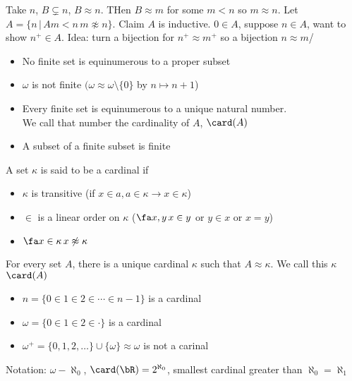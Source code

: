 \begin{pf}
    Take $n$, $B \subsetneq n$, $B \approx n$. THen $B \approx m$ for some $m < n$ so $m \approx n$. Let $A = \{n \, | \, A m < n \, m \not\approx n\}$. Claim $A$ is inductive. $0 \in A$, suppose $n \in A$, want to show $n^+ \in A$. Idea: turn a bijection for $n^+ \approx m^+$ so a bijection $n \approx m$/
\end{pf}

\begin{corollary}
    \begin{itemize}
        \item No finite set is equinumerous to a proper subset 
        \item $\omega$ is not finite $(\omega \approx \omega \setminus \{0\}$ by $n \mapsto n+1$)
        \item Every finite set is equinumerous to a unique natural number. \\
        We call that number the cardinality of $A$, $\card(A)$
        \item A subset of a finite subset is finite
    \end{itemize}
\end{corollary}

\begin{definition}
    A set $\kappa$ is said to be a cardinal if 
    \begin{itemize}
        \item $\kappa$ is transitive (if $x \in a, a \in \kappa \to x \in \kappa$)
        \item $\in$ is a linear order on $\kappa$ ($\fa x, y \, x \in y$ or $y \in x$ or $x=y$) 
        \item $\fa x \in \kappa \, x \not\approx \kappa$
    \end{itemize}
\end{definition}

\begin{theorem}
    For every set $A$, there is a unique cardinal $\kappa$ such that $A \approx \kappa$. We call this $\kappa$ $\card(A)$
\end{theorem}

\begin{example}
    \begin{itemize}
        \item $n = \{0 \in 1 \in 2 \in \cdots \in n-1\}$ is a cardinal 
        \item $\omega = \{0 \in 1 \in 2 \in \cdot \}$ is a cardinal 
        \item $\omega^+ = \{0, 1, 2, \ldots\} \cup \{\omega\} \approx \omega$ is not a carinal
    \end{itemize}
\end{example}

\noindent
Notation: $\omega - \aleph_0$, $\card(\bR) = 2^{\aleph_0}$, smallest cardinal greater than $\aleph_0 = \aleph_1$ 